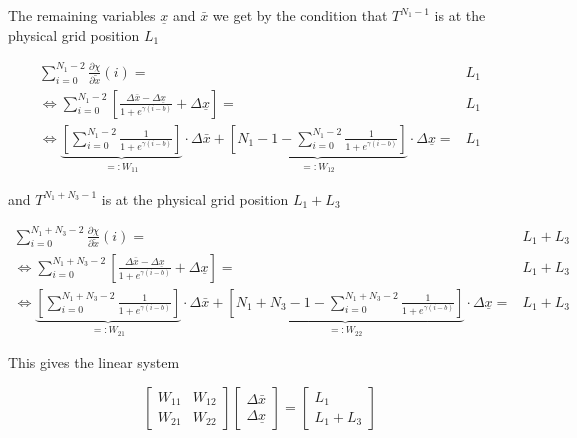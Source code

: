 \documentclass{scrartcl}[12pt, halfparskip]
\numberwithin{equation}{section}
\numberwithin{figure}{section}
\numberwithin{table}{section}
\begin{document}
The remaining variables $\underline{x}$ and $\bar{x}$ we get by the condition that $T^{N_1-1}$ is at the physical grid position $L_1$

\begin{subequations}
	\begin{align}
	\sum_{i=0}^{N_1 - 2} \frac{\partial \chi}{\partial \tilde{x}}(i) = & L_1 \\
	\Leftrightarrow \sum_{i=0}^{N_1 - 2} \left[ \frac{\Delta \bar{x} - \Delta \underline{x}}{1 + e^{\gamma(i - b)}} + \Delta \underline{x} \right] = & L_1 \\
	\Leftrightarrow \underbrace{ \left[ \sum_{i=0}^{N_1 - 2} \frac{1}{1 + e^{\gamma(i - b)}} \right] }_{=: W_{11}} \cdot \Delta \bar{x} + \underbrace{\left[ N_1 - 1 - \sum_{i=0}^{N_1 - 2} \frac{1}{1 + e^{\gamma(i - b)}} \right]}_{=: W_{12}} \cdot \Delta \underline{x} = & L_1
	\end{align}
\end{subequations}

and $T^{N_1+N_3-1}$ is at the physical grid position $L_1+L_3$

\begin{subequations}
	\begin{align}
	\sum_{i=0}^{N_1 + N_3 - 2} \frac{\partial \chi}{\partial \tilde{x}}(i) = & L_1 + L_3 \\
	\Leftrightarrow \sum_{i=0}^{N_1 + N_3 - 2} \left[ \frac{\Delta \bar{x} - \Delta \underline{x}}{1 + e^{\gamma(i - b)}} + \Delta \underline{x} \right] = & L_1 + L_3 \\
	\Leftrightarrow \underbrace{ \left[ \sum_{i=0}^{N_1 + N_3 - 2} \frac{1}{1 + e^{\gamma(i - b)}} \right] }_{=: W_{21}} \cdot \Delta \bar{x} + \underbrace{ \left[ N_1 + N_3 - 1 - \sum_{i=0}^{N_1 + N_3 - 2} \frac{1}{1 + e^{\gamma(i - b)}} \right] }_{=: W_{22}} \cdot \Delta \underline{x} = & L_1 + L_3
	\end{align}
\end{subequations}

This gives the linear system

\begin{equation}
	\begin{bmatrix}
		W_{11} & W_{12} \\
		W_{21} & W_{22}
	\end{bmatrix}
	\begin{bmatrix}
		\Delta \bar{x} \\
		\Delta \underline{x}
	\end{bmatrix}
	= 
	\begin{bmatrix}
		L_1 \\
		L_1 + L_3
	\end{bmatrix}
\end{equation}
  
\end{document}
